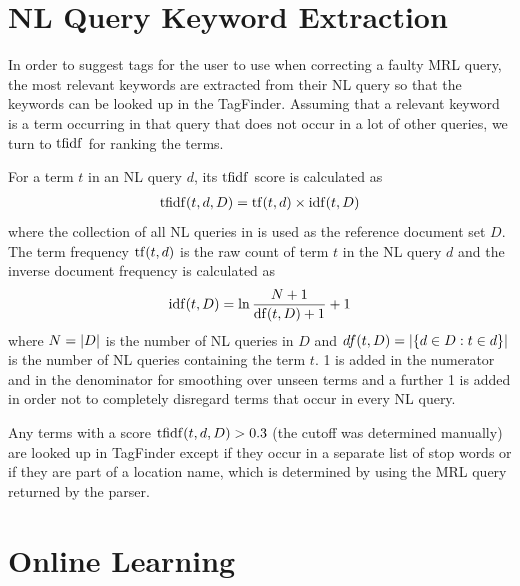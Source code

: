 
\section{NL Query Keyword Extraction}
\label{sec:keyword-extraction}

In order to suggest tags for the user to use when correcting a faulty MRL query,
the most relevant keywords are extracted from their NL query so that the
keywords can be looked up in the TagFinder. Assuming that a relevant keyword is
a term occurring in that query that does not occur in a lot of other queries, we
turn to \(\operatorname{tfidf}\) for ranking the terms.

For a term \(t\) in an NL query \(d\), its \(\operatorname{tfidf}\) score is calculated as
\begin{align}
  \operatorname{tfidf} (t, d, D) = \operatorname{tf}(t, d) \times \operatorname{idf}(t, D)
\end{align}
where the collection of all NL queries in \nlmapsthree{} is used as the
reference document set \(D\). The term frequency \(\operatorname{tf}(t, d)\) is the raw count
of term \(t\) in the NL query \(d\) and the inverse document frequency is
calculated as
\begin{align}
  \operatorname{idf}(t, D) = \ln \frac{N + 1}{\operatorname{df}(t, D) + 1} + 1
\end{align}
where \(N = \left|D\right|\) is the number of NL queries in \(D\) and \(df(t, D) =
\left|\left\{ d \in D : t \in d \right\}\right|\) is the number of NL queries
containing the term \(t\). \num{1} is added in the numerator and in the
denominator for smoothing over unseen terms and a further \num{1} is added in
order not to completely disregard terms that occur in every NL query.

Any terms with a score \(\operatorname{tfidf}(t, d, D) > 0.3\) (the cutoff was determined
manually) are looked up in TagFinder except if they occur in a separate list of
stop words or if they are part of a location name, which is determined by using
the MRL query returned by the parser.


\section{Online Learning}

